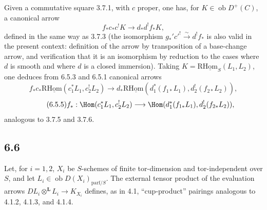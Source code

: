 Given a commutative square 3.7.1, with $c$ proper, one has, for $K\in\operatorname{ob}D^+(C)$, a canonical arrow
\begin{equation}
\tag{6.5.3}
f_*c_*c^!K\longrightarrow d_*d^!f_*K,
\end{equation}
defined in the same way as 3.7.3 (the isomorphism $g_*'c'^!\xrightarrow{\sim}d^!f_*$ is also valid in the present context: definition of the arrow by transposition of a base-change arrow, and verification that it is an isomorphism by reduction to the cases where $d$ is smooth and where $d$ is a closed immersion). Taking $K=\mathrm{R}\underline{\mathrm{Hom}}_S(L_1,L_2)$, one deduces from 6.5.3 and 6.5.1 canonical arrows
\begin{equation}
\tag{6.5.4}
f_*c_*\mathrm{R}\underline{\mathrm{Hom}}(c_1^*L_1,c_2^!L_2)\longrightarrow d_*\mathrm{R}\underline{\mathrm{Hom}}(d_1^*(f_{1*}L_1),d_2^!(f_{2*}L_2)),
\end{equation}
\begin{equation}
\tag{6.5.5}
f_*:\Hom(c_1^*L_1,c_2^!L_2)\longrightarrow\Hom(d_1^*(f_{1*}L_1),d_2^!(f_{2*}L_2)),
\end{equation}
analogous to 3.7.5 and 3.7.6.

\subsection*{6.6}
Let, for $i=1,2$, $X_i$ be $S$-schemes of finite tor-dimension and tor-independent over $S$, and let $L_i\in\operatorname{ob}D(X_i)_{\mathrm{parf}/S}$. The external tensor product of the evaluation arrows $DL_i\otimes^{\mathbf L}L_i\to K_{X_i}$ defines, as in 4.1, ``cup-product'' pairings analogous to 4.1.2, 4.1.3, and 4.1.4.

